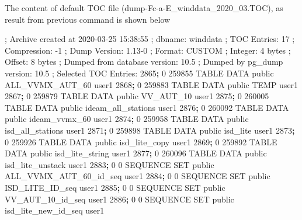 \documentclass[12pt,oneside]{reedthesis}
\newenvironment{Shaded}{\begin{snugshade}}{\end{snugshade}}
\newcommand{\ExtensionTok}[1]{#1}
\newcommand{\KeywordTok}[1]{\textcolor[rgb]{0.13,0.29,0.53}{\textbf{#1}}}
\newcommand{\NormalTok}[1]{#1}
\begin{document}
The content of default TOC file (dump-Fc-a-E\_winddata\_2020\_03.TOC), as result from previous command is shown below

\scriptsize

\vspace{0.4cm}
\begin{Shaded}
\begin{Highlighting}[]
\NormalTok{      ; }\ExtensionTok{Archive}\NormalTok{ created at 2020-03-25 15:38:55}
\NormalTok{      ;     }\ExtensionTok{dbname}\NormalTok{: winddata}
\NormalTok{      ;     }\ExtensionTok{TOC}\NormalTok{ Entries: 17}
\NormalTok{      ;     }\ExtensionTok{Compression}\NormalTok{: -1}
\NormalTok{      ;     }\ExtensionTok{Dump}\NormalTok{ Version: 1.13-0}
\NormalTok{      ;     }\ExtensionTok{Format}\NormalTok{: CUSTOM}
\NormalTok{      ;     }\ExtensionTok{Integer}\NormalTok{: 4 bytes}
\NormalTok{      ;     }\ExtensionTok{Offset}\NormalTok{: 8 bytes}
\NormalTok{      ;     }\ExtensionTok{Dumped}\NormalTok{ from database version: 10.5}
\NormalTok{      ;     }\ExtensionTok{Dumped}\NormalTok{ by pg_dump version: 10.5}
\NormalTok{      ; }\ExtensionTok{Selected}\NormalTok{ TOC Entries:}
      \ExtensionTok{2865}\KeywordTok{;} \ExtensionTok{0}\NormalTok{ 259855 TABLE DATA public ALL_VVMX_AUT_60 user1}
      \ExtensionTok{2868}\KeywordTok{;} \ExtensionTok{0}\NormalTok{ 259883 TABLE DATA public TEMP user1}
      \ExtensionTok{2867}\KeywordTok{;} \ExtensionTok{0}\NormalTok{ 259879 TABLE DATA public VV_AUT_10 user1}
      \ExtensionTok{2875}\KeywordTok{;} \ExtensionTok{0}\NormalTok{ 260005 TABLE DATA public ideam_all_stations user1}
      \ExtensionTok{2876}\KeywordTok{;} \ExtensionTok{0}\NormalTok{ 260092 TABLE DATA public ideam_vvmx_60 user1}
      \ExtensionTok{2874}\KeywordTok{;} \ExtensionTok{0}\NormalTok{ 259958 TABLE DATA public isd_all_stations user1}
      \ExtensionTok{2871}\KeywordTok{;} \ExtensionTok{0}\NormalTok{ 259898 TABLE DATA public isd_lite user1}
      \ExtensionTok{2873}\KeywordTok{;} \ExtensionTok{0}\NormalTok{ 259926 TABLE DATA public isd_lite_copy user1}
      \ExtensionTok{2869}\KeywordTok{;} \ExtensionTok{0}\NormalTok{ 259892 TABLE DATA public isd_lite_string user1}
      \ExtensionTok{2877}\KeywordTok{;} \ExtensionTok{0}\NormalTok{ 260096 TABLE DATA public isd_lite_unstack user1}
      \ExtensionTok{2883}\KeywordTok{;} \ExtensionTok{0}\NormalTok{ 0 SEQUENCE SET public ALL_VVMX_AUT_60_id_seq user1}
      \ExtensionTok{2884}\KeywordTok{;} \ExtensionTok{0}\NormalTok{ 0 SEQUENCE SET public ISD_LITE_ID_seq user1}
      \ExtensionTok{2885}\KeywordTok{;} \ExtensionTok{0}\NormalTok{ 0 SEQUENCE SET public VV_AUT_10_id_seq user1}
      \ExtensionTok{2886}\KeywordTok{;} \ExtensionTok{0}\NormalTok{ 0 SEQUENCE SET public isd_lite_new_id_seq user1}
\end{Highlighting}
\end{Shaded}
\normalsize
\end{document}
